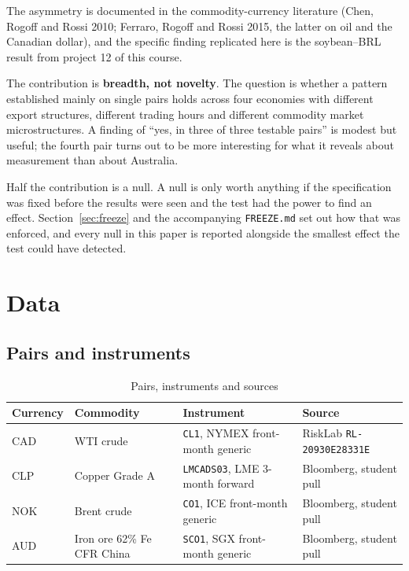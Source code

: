 \documentclass[11pt,a4paper]{article}
\begin{document}
The asymmetry is documented in the commodity-currency
literature (Chen, Rogoff and Rossi 2010; Ferraro, Rogoff and Rossi 2015, the
latter on oil and the Canadian dollar), and the specific finding replicated here
is the soybean--BRL result
from project 12 of this course.

The contribution is \textbf{breadth, not novelty}. The question is whether a
pattern established mainly on single pairs holds across four economies with
different export structures, different trading hours and different commodity
market microstructures. A finding of ``yes, in three of three testable pairs''
is modest but useful; the fourth pair turns out to be more interesting for what
it reveals about measurement than about Australia.

Half the contribution is a null. A null is only worth anything if the
specification was fixed before the results were seen and the test had the power
to find an effect. Section~\ref{sec:freeze} and the accompanying
\texttt{FREEZE.md} set out how that was enforced, and every null in this paper
is reported alongside the smallest effect the test could have detected.

\section{Data}

\subsection{Pairs and instruments}

\begin{table}[htbp]
\centering
\caption{Pairs, instruments and sources}
\begin{tabular}{llll}
\toprule
Currency & Commodity & Instrument & Source \\
\midrule
CAD & WTI crude & \texttt{CL1}, NYMEX front-month generic & RiskLab \texttt{RL-20930E28331E} \\
CLP & Copper Grade A & \texttt{LMCADS03}, LME 3-month forward & Bloomberg, student pull \\
NOK & Brent crude & \texttt{CO1}, ICE front-month generic & Bloomberg, student pull \\
AUD & Iron ore 62\% Fe CFR China & \texttt{SCO1}, SGX front-month generic & Bloomberg, student pull \\
\bottomrule
\end{tabular}
\end{table}
\end{document}
